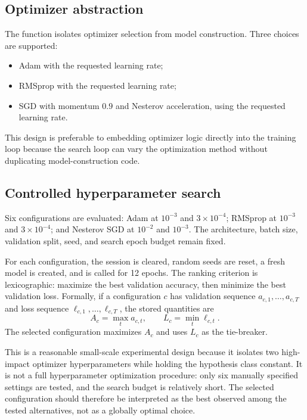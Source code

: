\documentclass[11pt,a4paper]{article}
\newcommand{\code}[1]{\texttt{\detokenize{#1}}}
\begin{document}
\subsection{Optimizer abstraction}
The \code{make_optimizer} function isolates optimizer selection from model construction. Three choices are supported:
\begin{itemize}
\item Adam with the requested learning rate;
\item RMSprop with the requested learning rate;
\item SGD with momentum $0.9$ and Nesterov acceleration, using the requested learning rate.
\end{itemize}
This design is preferable to embedding optimizer logic directly into the training loop because the search loop can vary the optimization method without duplicating model-construction code.

\subsection{Controlled hyperparameter search}
Six configurations are evaluated: Adam at $10^{-3}$ and $3\times10^{-4}$; RMSprop at $10^{-3}$ and $3\times10^{-4}$; and Nesterov SGD at $10^{-2}$ and $10^{-3}$. The architecture, batch size, validation split, seed, and search epoch budget remain fixed.

For each configuration, the session is cleared, random seeds are reset, a fresh model is created, and \code{fit} is called for 12 epochs. The ranking criterion is lexicographic: maximize the best validation accuracy, then minimize the best validation loss. Formally, if a configuration $c$ has validation sequence $a_{c,1},\ldots,a_{c,T}$ and loss sequence $\ell_{c,1},\ldots,\ell_{c,T}$, the stored quantities are
\begin{equation}
A_c=\max_t a_{c,t},\qquad L_c=\min_t\ell_{c,t}.
\end{equation}
The selected configuration maximizes $A_c$ and uses $L_c$ as the tie-breaker.

This is a reasonable small-scale experimental design because it isolates two high-impact optimizer hyperparameters while holding the hypothesis class constant. It is not a full hyperparameter optimization procedure: only six manually specified settings are tested, and the search budget is relatively short. The selected configuration should therefore be interpreted as the best observed among the tested alternatives, not as a globally optimal choice.
\end{document}
